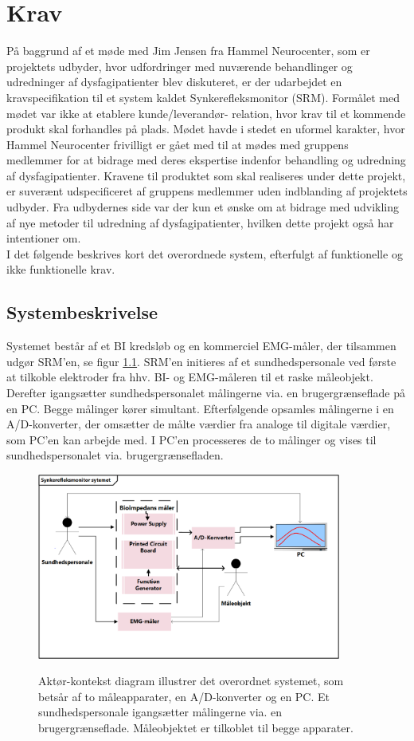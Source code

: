 \chapter{Krav} \label{Af:Krav}

På baggrund af et møde med Jim Jensen fra Hammel Neurocenter, som er projektets udbyder, hvor udfordringer med nuværende behandlinger og udredninger af dysfagipatienter blev diskuteret, er der udarbejdet en kravspecifikation til et system kaldet Synkerefleksmonitor (SRM). Formålet med mødet var ikke at etablere kunde/leverandør- relation, hvor krav til et kommende produkt skal forhandles på plads. Mødet havde i stedet en uformel karakter, hvor Hammel Neurocenter frivilligt er gået med til at mødes med gruppens medlemmer for at bidrage med deres ekspertise indenfor behandling og udredning af dysfagipatienter. Kravene til produktet som skal realiseres under dette projekt, er suverænt udspecificeret af gruppens medlemmer uden indblanding af projektets udbyder. Fra udbydernes side var der kun et ønske om at bidrage med udvikling af nye metoder til udredning af dysfagipatienter, hvilken dette projekt også har intentioner om. \\

I det følgende beskrives kort det overordnede system, efterfulgt af funktionelle og ikke funktionelle krav.  

\section{Systembeskrivelse}
Systemet består af et BI kredsløb og en kommerciel EMG-måler, der tilsammen udgør SRM'en, se figur \ref{fig:sysbeskrivelse}. SRM'en initieres af et sundhedspersonale ved første at tilkoble elektroder fra hhv. BI- og EMG-måleren til et raske måleobjekt. Derefter igangsætter sundhedspersonalet målingerne via. en brugergrænseflade på en PC. Begge målinger kører simultant. Efterfølgende opsamles målingerne i en A/D-konverter, der omsætter de målte værdier fra analoge til digitale værdier, som PC'en kan arbejde med. I PC'en processeres de to målinger og vises til sundhedspersonalet via. brugergrænsefladen.   

\begin{figure}[H]
\centering
{\includegraphics[width=10cm]
{Figure/AktoerKontextDiagram}}
\caption{Aktør-kontekst diagram illustrer det overordnet systemet, som betsår af to måleapparater, en A/D-konverter og en PC. Et sundhedspersonale igangsætter målingerne via. en brugergrænseflade. Måleobjektet er tilkoblet til begge apparater. }
\label{fig:sysbeskrivelse}
\end{figure}  


